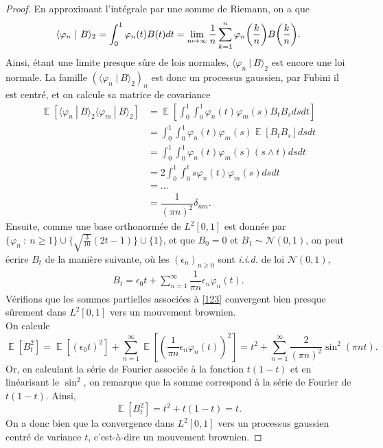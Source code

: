 \documentclass{article}
\theoremstyle{definition}
\numberwithin{equation}{section}
\DeclareMathOperator{\E}{\mathbb{E}}
\begin{document}
\begin{proof}
En approximant l'intégrale par une somme de Riemann, on a que
$$\langle \varphi_n~|~B\rangle_2 = \int_0^1\varphi_n(t)B(t)dt=\lim_{n\mapsto\infty} \dfrac{1}{n}\sum_{k=1}^n \varphi_n{\small\left(\dfrac{k}{n}\right)}B{\small\left(\dfrac{k}{n}\right)}.$$
Ainsi, étant une limite presque sûre de lois normales, $\langle \varphi_n~|~B\rangle_2$ est encore une loi normale. La famille $(\langle \varphi_n~|~B\rangle_2)_n$ est donc un processus gaussien, par Fubini il est centré, et on calcule sa matrice de covariance 
\begin{align*}
    \E[\langle \varphi_n~|~B\rangle_2 \langle \varphi_m~|~B\rangle_2] &= \E\left[\int_0^1\int_0^1 \varphi_n(t)\varphi_m(s) B_tB_sdsdt \right]\\
    &= \int_0^1\int_0^1 \varphi_n(t)\varphi_m(s) \E[B_tB_s]dsdt\\
    &= \int_0^1\int_0^1 \varphi_n(t)\varphi_m(s) (s\wedge t)dsdt\\ 
    &=2\int_0^1\int_0^t s \varphi_n(t)\varphi_m(s)dsdt\\
    &=\dots\\
    &=\dfrac{1}{(\pi n)^2}\delta_{nm}.
\end{align*}
Ensuite, comme une base orthonormée de $L^2[0,1]$ est donnée par $\{\varphi_n~:~n\geq 1\}\cup \{\sqrt{\frac{3}{10}}(2t-1)\}\cup \{1\}$, et que $B_0=0$ et $B_1\sim\mathcal{N}(0,1)$, on peut écrire $B_t$ de la manière suivante, où les $(\epsilon_n)_{n\geq 0}$ sont \textit{i.i.d.} de loi $\mathcal{N}(0,1)$,
\begin{align}
    \label{123}
    B_t = \epsilon_0 t + \sum_{n=1}^\infty \dfrac{1}{\pi n}\epsilon_n \varphi_n(t).
\end{align} 
Vérifions que les sommes partielles associées à \eqref{123} convergent bien presque sûrement dans $L^2[0,1]$ vers un mouvement brownien.\\
On calcule
$$\E[B_t^2] = \E[(\epsilon_0 t)^2] + \sum_{n=1}^\infty \E\left[\left(\dfrac{1}{\pi n}\epsilon_n \varphi_n(t)\right)^2\right] = t^2 + \sum_{n=1}^\infty \dfrac{2}{(\pi n)^2}\sin^2(\pi n t).$$
Or, en calculant la série de Fourier associée à la fonction $t(1-t)$ et en linéarisant le $\sin^2$, on remarque que la somme correspond à la série de Fourier de $t(1-t)$. Ainsi,
$$\E[B_t^2]=t^2+t(1-t)=t.$$
On a donc bien que la convergence dans $L^2[0,1]$ vers un processus gaussien centré de variance $t$, c'est-à-dire un mouvement brownien.
\end{proof}
\end{document}
